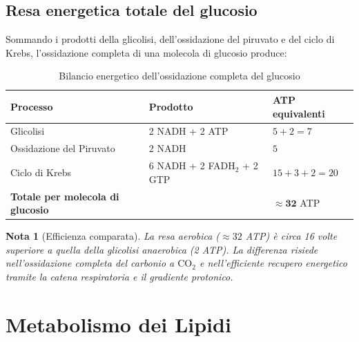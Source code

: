 \documentclass[12pt,a4paper]{report}
\newtheorem{nota}{Nota}[section]
\begin{document}
\section{Resa energetica totale del glucosio}
Sommando i prodotti della glicolisi, dell'ossidazione del piruvato e del ciclo di Krebs, l'ossidazione completa di una molecola di glucosio produce:
\begin{table}[htbp]
\centering
\caption{Bilancio energetico dell'ossidazione completa del glucosio}
\label{tab:resa-glucosio}
\renewcommand{\arraystretch}{1.2}
\begin{tabular}{@{} p{} p{} p{} @{}}
\toprule
\textbf{Processo} & \textbf{Prodotto} & \textbf{ATP equivalenti} \\
\midrule
Glicolisi & 2 NADH + 2 ATP & \(5 + 2 = 7\) \\
Ossidazione del Piruvato & 2 NADH & \(5\) \\
Ciclo di Krebs & 6 NADH + 2 FADH\(_2\) + 2 GTP & \(15 + 3 + 2 = 20\) \\
\midrule
\textbf{Totale per molecola di glucosio} & & \(\approx \mathbf{32}\) ATP \\
\bottomrule
\end{tabular}
\end{table}
\begin{nota}[Efficienza comparata]
La resa aerobica (\(\approx 32\) ATP) è circa 16 volte superiore a quella della glicolisi anaerobica (2 ATP). La differenza risiede nell'ossidazione completa del carbonio a \(\mathrm{CO_2}\) e nell'efficiente recupero energetico tramite la catena respiratoria e il gradiente protonico.
\end{nota}

\chapter{Metabolismo dei Lipidi}
\end{document}
